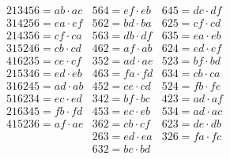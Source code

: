 \documentclass[12pt,a4paper]{article}
\theoremstyle{definition}
\begin{document}
\begin{equation}\tag{B}
\begin{array}{lll}
213456 = ab \cdot ac & 564 = ef \cdot eb & 645 = dc \cdot df \\
314256 = ea \cdot ef & 562 = bd \cdot ba & 625 = cf \cdot cd \\
214356 = cf \cdot ca & 563 = db \cdot df & 635 = ea \cdot eb \\
315246 = cb \cdot cd & 462 = af \cdot ab & 624 = ed \cdot ef \\
416235 = ce \cdot cf & 352 = ad \cdot ae & 523 = bf \cdot bd \\
215346 = ed \cdot eb & 463 = fa \cdot fd & 634 = cb \cdot ca \\
316245 = ad \cdot ab & 452 = ce \cdot cd & 524 = fb \cdot fe \\
516234 = ec \cdot ed & 342 = bf \cdot bc & 423 = ad \cdot af \\
216345 = fb \cdot fd & 453 = ec \cdot eb & 534 = ad \cdot ac \\
415236 = af \cdot ae & 362 = cb \cdot cf & 623 = de \cdot db \\
& 263 = ed \cdot ea & 326 = fa \cdot fc \\
& 632 = bc \cdot bd
\end{array}
\end{equation}
\end{document}

